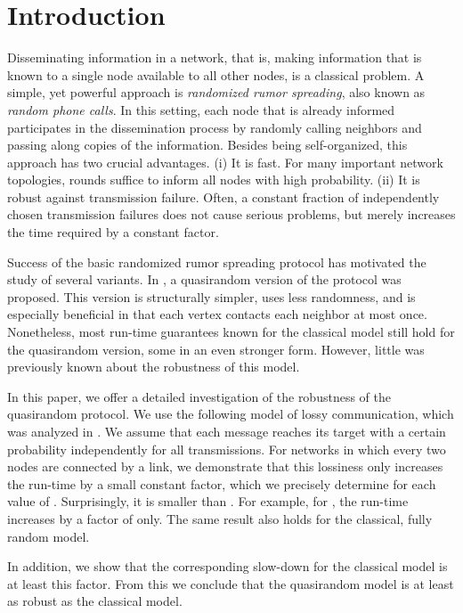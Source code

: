 \documentclass[12pt]{article}
\begin{document}
{\sloppy
\section{Introduction}
  Disseminating information in a network, that is, making information that is known to a single node available to all other nodes, is a classical problem. A simple, yet powerful approach is \emph{randomized rumor spreading}, also known as \emph{random phone calls}. In this setting, each node that is already informed participates in the dissemination process by  randomly calling neighbors and passing along copies of the information. Besides being self-organized, this approach has two crucial advantages. (i) It is fast. For many important network topologies,  rounds suffice to inform all  nodes with high probability. (ii) It is robust against transmission failure. Often, a constant fraction of independently chosen transmission failures does not cause serious problems, but merely increases the time required by a constant factor. 
  
  Success of the basic randomized rumor spreading protocol has motivated the study of several variants. In \cite{DFS08}, a quasirandom version of the protocol was proposed. This version is structurally simpler, uses less randomness, and is especially beneficial in that each vertex contacts each neighbor at most once. Nonetheless, most run-time guarantees known for the classical model still hold for the quasirandom version, some in an even stronger form. However, little was previously known about the robustness of this model. 
  
  In this paper, we offer a detailed investigation of the robustness of the quasirandom protocol. We use the following model of lossy communication, which was analyzed in \cite{MR2239598}. We assume that each message reaches its target with a certain probability  independently for all transmissions. For networks in which every two nodes are connected by a link, we demonstrate that this lossiness only increases the run-time by a small constant factor, which we precisely determine for each value of . Surprisingly, it is smaller than . For example, for , the run-time increases by a factor of  only. The same result also holds for the classical, fully random model.
  
  In addition, we show that the corresponding slow-down for the classical model is at least this factor. From this we conclude that the quasirandom model is at least as robust as the classical model. 
  
}
\end{document}
